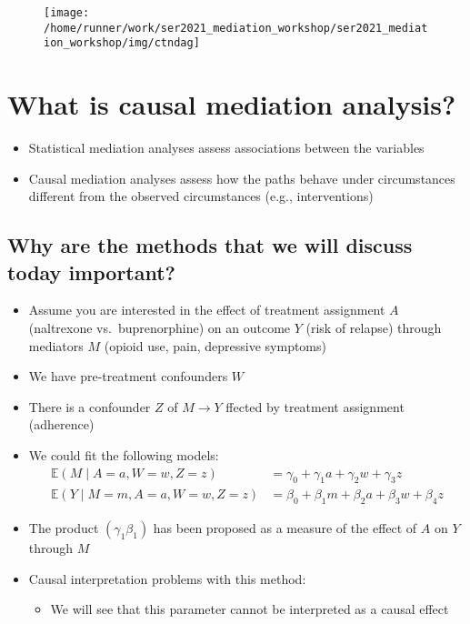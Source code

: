 \documentclass[
  12pt,
]{book}
\providecommand{\tightlist}{%
  \setlength{\itemsep}{0pt}\setlength{\parskip}{0pt}}
\theoremstyle{definition}
\theoremstyle{definition}
\theoremstyle{definition}
\newcommand{\E}{\mathbb{E}}
\newcommand{\1}{\mathbbm{1}}
\begin{document}
\begin{figure}

{\centering \texttt{[image: /home/runner/work/ser2021\_mediation\_workshop/ser2021\_mediation\_workshop/img/ctndag]} 

}

\end{figure}

\hypertarget{what-is-causal-mediation-analysis}{%
\section{What is causal mediation analysis?}\label{what-is-causal-mediation-analysis}}

\begin{itemize}
\tightlist
\item
  Statistical mediation analyses assess associations between the variables
\item
  Causal mediation analyses assess how the paths behave under circumstances
  different from the observed circumstances (e.g., interventions)
\end{itemize}

\hypertarget{why-are-the-methods-that-we-will-discuss-today-important}{%
\subsection{Why are the methods that we will discuss today important?}\label{why-are-the-methods-that-we-will-discuss-today-important}}

\begin{itemize}
\tightlist
\item
  Assume you are interested in the effect of treatment assignment \(A\)
  (naltrexone vs.~buprenorphine) on an outcome \(Y\) (risk of relapse) through
  mediators \(M\) (opioid use, pain, depressive symptoms)
\item
  We have pre-treatment confounders \(W\)
\item
  There is a confounder \(Z\) of \(M\rightarrow Y\) ffected by treatment assignment
  (adherence)
\item
  We could fit the following models:
  \begin{align}
      \E(M\mid A=a, W=w, Z=z) & = \gamma_0 + \gamma_1 a + \gamma_2 w + \gamma_3 z \\
      \E(Y\mid M=m, A=a, W=w, Z=z) & = \beta_0 + \beta_1 m + \beta_2 a + \beta_3 w + \beta_4 z
    \end{align}
\item
  The product \((\gamma_1\beta_1)\) has been proposed as a measure of the effect
  of \(A\) on \(Y\) through \(M\)
\item
  Causal interpretation problems with this method:

  \begin{itemize}
  \tightlist
  \item
    We will see that this parameter cannot be interpreted as a causal effect
  \end{itemize}
\end{itemize}
\end{document}
